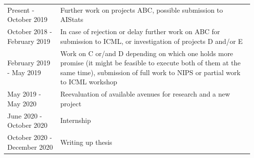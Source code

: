 \documentclass[12pt]{article}
\begin{document}
\begin{table}[h!]
\begin{tabular}{lp{11cm}}
Present - October 2019         & Further work on projects ABC, possible submission to AIStats \\
October 2018 - February 2019   & In case of rejection or delay further work on ABC for submission to ICML, or investigation of projects D and/or E \\
February 2019 - May 2019       & Work on C or/and D depending on which one holds more promise (it might be feasible to execute both of them at the same time), submission of full work to NIPS or partial work to ICML workshop \\
May 2019 - May 2020            & Reevaluation of available avenues for research and a new project \\
June 2020 - October 2020       & Internship \\
October 2020 - December 2020   & Writing up thesis
\end{tabular}
\end{table}





\newpage 

 
\end{document}
